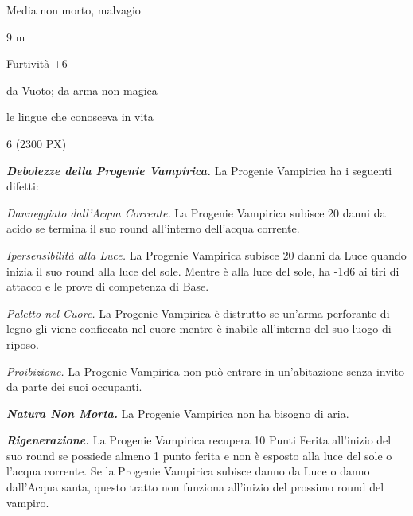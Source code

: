 \begin{multicols}{2}
{
\begin{description}[noitemsep, topsep=0pt, parsep=0pt, partopsep=0pt, itemsep=1pt, leftmargin=2.35cm,  labelwidth=2.2cm, itemindent=0cm, listparindent=0pt] %
\setlength{\baselineskip}{10pt}
\item[\textbf{Taglia/Tipo}] Media non morto, malvagio
\item[\textbf{Movimento}] 9 m
\item[\textbf{Tiri Salvez.}] 
\item[\textbf{Caratt.}] 
\item[\textbf{Punti Ferita}] 
\item[\textbf{Comp.}] Furtività +6
\item[\textbf{Res. Danni}] da Vuoto; da arma non magica
\item[\textbf{Sensi}] 
\item[\textbf{Linguaggi}] le lingue che conosceva in vita
\item[\textbf{Sfida}] 6 (2300 PX)
\end{description}
\smallskip

\emph{\textbf{Debolezze della Progenie Vampirica.}} La Progenie Vampirica ha i seguenti difetti:

\emph{Danneggiato dall'Acqua Corrente.} La Progenie Vampirica subisce 20 danni da acido se termina il suo round all'interno dell'acqua corrente.

\emph{Ipersensibilità alla Luce.} La Progenie Vampirica subisce 20 danni da Luce quando inizia il suo round alla luce del sole. Mentre è alla luce del sole, ha -1d6 ai tiri di attacco e le prove di competenza di Base.

\emph{Paletto nel Cuore.} La Progenie Vampirica è distrutto se un'arma perforante di legno gli viene conficcata nel cuore mentre è inabile all'interno del suo luogo di riposo.

\emph{Proibizione.} La Progenie Vampirica non può entrare in un'abitazione senza invito da parte dei suoi occupanti.

\emph{\textbf{Natura Non Morta.}} La Progenie Vampirica non ha bisogno di aria.

\emph{\textbf{Rigenerazione.}} La Progenie Vampirica recupera 10 Punti Ferita all'inizio del suo round se possiede almeno 1 punto ferita e non è esposto alla luce del sole o l'acqua corrente. Se la Progenie Vampirica subisce danno da Luce o danno dall'Acqua santa, questo tratto non funziona all'inizio del prossimo round del vampiro.

}
\end{multicols}
